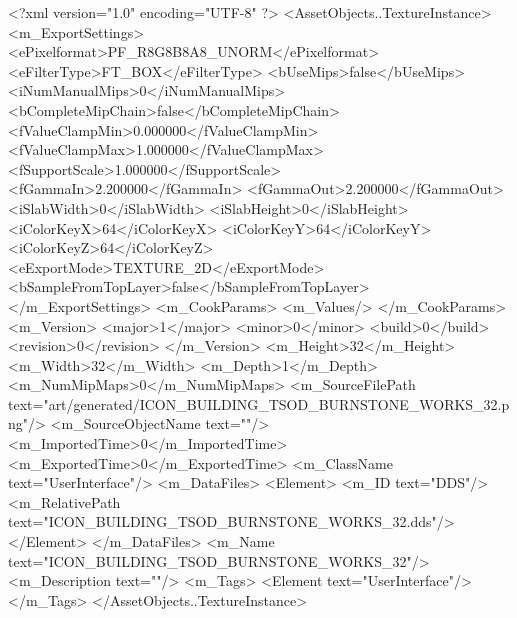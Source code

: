 <?xml version="1.0" encoding="UTF-8" ?>
<AssetObjects..TextureInstance>
	<m_ExportSettings>
		<ePixelformat>PF_R8G8B8A8_UNORM</ePixelformat>
		<eFilterType>FT_BOX</eFilterType>
		<bUseMips>false</bUseMips>
		<iNumManualMips>0</iNumManualMips>
		<bCompleteMipChain>false</bCompleteMipChain>
		<fValueClampMin>0.000000</fValueClampMin>
		<fValueClampMax>1.000000</fValueClampMax>
		<fSupportScale>1.000000</fSupportScale>
		<fGammaIn>2.200000</fGammaIn>
		<fGammaOut>2.200000</fGammaOut>
		<iSlabWidth>0</iSlabWidth>
		<iSlabHeight>0</iSlabHeight>
		<iColorKeyX>64</iColorKeyX>
		<iColorKeyY>64</iColorKeyY>
		<iColorKeyZ>64</iColorKeyZ>
		<eExportMode>TEXTURE_2D</eExportMode>
		<bSampleFromTopLayer>false</bSampleFromTopLayer>
	</m_ExportSettings>
	<m_CookParams>
		<m_Values/>
	</m_CookParams>
	<m_Version>
		<major>1</major>
		<minor>0</minor>
		<build>0</build>
		<revision>0</revision>
	</m_Version>
	<m_Height>32</m_Height>
	<m_Width>32</m_Width>
	<m_Depth>1</m_Depth>
	<m_NumMipMaps>0</m_NumMipMaps>
	<m_SourceFilePath text="art/generated/ICON_BUILDING_TSOD_BURNSTONE_WORKS_32.png"/>
	<m_SourceObjectName text=""/>
	<m_ImportedTime>0</m_ImportedTime>
	<m_ExportedTime>0</m_ExportedTime>
	<m_ClassName text="UserInterface"/>
	<m_DataFiles>
		<Element>
			<m_ID text="DDS"/>
			<m_RelativePath text="ICON_BUILDING_TSOD_BURNSTONE_WORKS_32.dds"/>
		</Element>
	</m_DataFiles>
	<m_Name text="ICON_BUILDING_TSOD_BURNSTONE_WORKS_32"/>
	<m_Description text=""/>
	<m_Tags>
		<Element text="UserInterface"/>
	</m_Tags>
</AssetObjects..TextureInstance>
